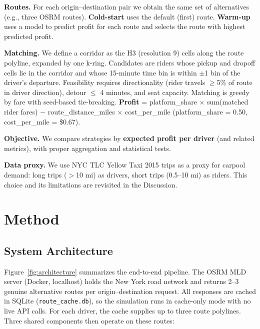 \documentclass[11pt,a4paper]{article}
\begin{document}
\textbf{Routes.} For each origin--destination pair we obtain the same set of alternatives (e.g., three OSRM routes). \textbf{Cold-start} uses the default (first) route. \textbf{Warm-up} uses a model to predict profit for each route and selects the route with highest predicted profit.

\textbf{Matching.} We define a corridor as the H3 (resolution 9) cells along the route polyline, expanded by one k-ring. Candidates are riders whose pickup and dropoff cells lie in the corridor and whose 15-minute time bin is within $\pm$1 bin of the driver's departure. Feasibility requires directionality (rider travels $\ge$5\% of route in driver direction), detour $\le$ 4 minutes, and seat capacity. Matching is greedy by fare with seed-based tie-breaking. \textbf{Profit} = platform\_share $\times$ sum(matched rider fares) $-$ route\_distance\_miles $\times$ cost\_per\_mile (platform\_share = 0.50, cost\_per\_mile = \$0.67).

\textbf{Objective.} We compare strategies by \textbf{expected profit per driver} (and related metrics), with proper aggregation and statistical tests.

\textbf{Data proxy.} We use NYC TLC Yellow Taxi 2015 trips as a proxy for carpool demand: long trips ($>$10 mi) as drivers, short trips (0.5--10 mi) as riders. This choice and its limitations are revisited in the Discussion.

\section{Method}
\label{sec:method}

\subsection{System Architecture}
\label{sec:architecture}

Figure~\ref{fig:architecture} summarizes the end-to-end pipeline. The OSRM MLD server (Docker, localhost) holds the New York road network and returns 2--3 genuine alternative routes per origin--destination request. All responses are cached in SQLite (\texttt{route\_cache.db}), so the simulation runs in cache-only mode with no live API calls. For each driver, the cache supplies up to three route polylines. Three shared components then operate on these routes:
\end{document}
